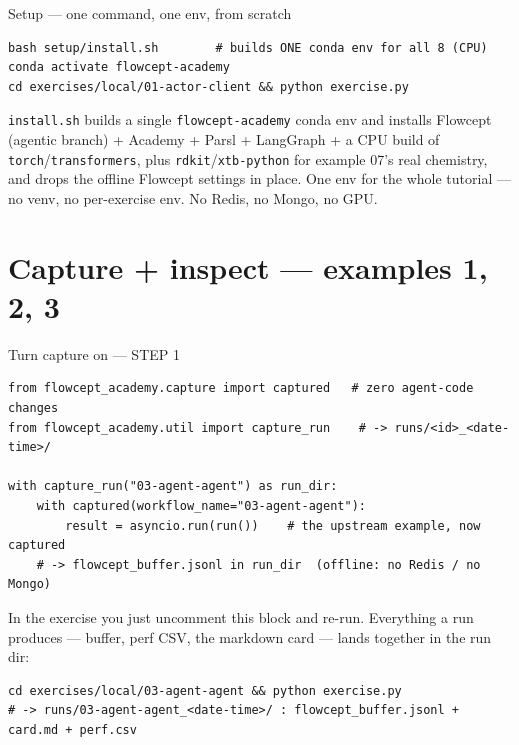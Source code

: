 \documentclass[aspectratio=169,11pt]{beamer}
\begin{document}
\begin{frame}[fragile]{Setup --- one command, one env, from scratch}
\begin{lstlisting}[style=sh]
bash setup/install.sh        # builds ONE conda env for all 8 (CPU)
conda activate flowcept-academy
cd exercises/local/01-actor-client && python exercise.py
\end{lstlisting}
  \small \texttt{install.sh} builds a single \texttt{flowcept-academy} conda env and
  installs Flowcept (agentic branch) + Academy + Parsl + LangGraph + a CPU build of
  \texttt{torch}/\texttt{transformers}, plus \texttt{rdkit}/\texttt{xtb-python} for
  example 07's real chemistry, and drops the offline Flowcept settings in place.
  \alert{One env for the whole tutorial} --- no venv, no per-exercise env. No Redis,
  no Mongo, no GPU.
\end{frame}

\section{Capture + inspect --- examples 1, 2, 3}

\begin{frame}[fragile]{Turn capture on --- STEP 1}
\begin{lstlisting}
from flowcept_academy.capture import captured   # zero agent-code changes
from flowcept_academy.util import capture_run    # -> runs/<id>_<date-time>/

with capture_run("03-agent-agent") as run_dir:
    with captured(workflow_name="03-agent-agent"):
        result = asyncio.run(run())    # the upstream example, now captured
    # -> flowcept_buffer.jsonl in run_dir  (offline: no Redis / no Mongo)
\end{lstlisting}
  \small In the exercise you just uncomment this block and re-run. Everything a run
  produces --- buffer, perf CSV, the markdown card --- lands together in the run dir:
\begin{lstlisting}[style=sh]
cd exercises/local/03-agent-agent && python exercise.py
# -> runs/03-agent-agent_<date-time>/ : flowcept_buffer.jsonl + card.md + perf.csv
\end{lstlisting}
\end{frame}
\end{document}
